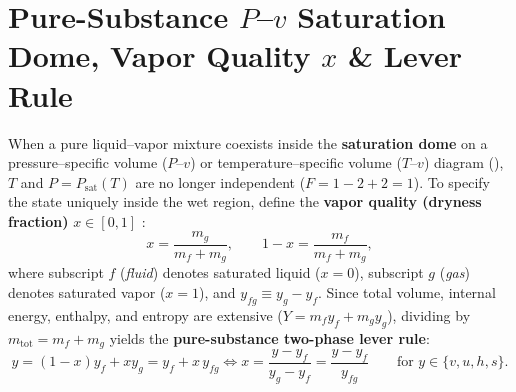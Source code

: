 \section{Pure-Substance $P$--$v$ Saturation Dome, Vapor Quality $x$ \& Lever Rule}
\label{sec:05.3}

When a pure liquid--vapor mixture coexists inside the \textbf{saturation dome} on a pressure--specific volume ($P$--$v$) or temperature--specific volume ($T$--$v$) diagram (), $T$ and $P = P_{\mathrm{sat}}(T)$ are no longer independent ($F = 1 - 2 + 2 = 1$). To specify the state uniquely inside the wet region, define the \textbf{vapor quality (dryness fraction)} $x \in [0,1]$ :
\begin{equation}\label{eq:05:quality}
  x = \frac{m_g}{m_f + m_g}, \qquad 1 - x = \frac{m_f}{m_f + m_g},
\end{equation}
where subscript $f$ (\emph{fluid}) denotes saturated liquid ($x = 0$), subscript $g$ (\emph{gas}) denotes saturated vapor ($x = 1$), and $y_{fg} \equiv y_g - y_f$. Since total volume, internal energy, enthalpy, and entropy are extensive ($Y = m_f y_f + m_g y_g$), dividing by $m_{\mathrm{tot}} = m_f + m_g$ yields the \textbf{pure-substance two-phase lever rule}:
\begin{equation}\label{eq:05:purelever}
  y = (1 - x)y_f + x y_g = y_f + x\,y_{fg} \iff x = \frac{y - y_f}{y_g - y_f} = \frac{y - y_f}{y_{fg}} \qquad \text{for } y \in \{v, u, h, s\}.
\end{equation}

